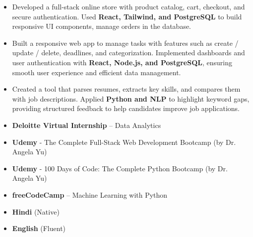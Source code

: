 

\begin{itemize}
\item Developed a full-stack online store with product catalog, cart, checkout, and secure authentication. Used \textbf{React, Tailwind, and PostgreSQL} to build responsive UI components, manage orders in the database. 
\end{itemize}
\smallskip
\smallskip
{}
\begin{itemize}
\item Built a responsive web app to manage tasks with features such as create / update / delete, deadlines, and categorization. Implemented dashboards and user authentication with \textbf{React, Node.js, and PostgreSQL}, ensuring smooth user experience and efficient data management. 
\end{itemize}
\smallskip
\smallskip
{}
\begin{itemize}
\item Created a tool that parses resumes, extracts key skills, and compares them with job descriptions. Applied \textbf{Python and NLP} to highlight keyword gaps, providing structured feedback to help candidates improve job applications. 
\end{itemize}
\smallskip
\smallskip

\smallskip
    \begin{itemize}
        \item \textbf{Deloitte Virtual Internship} – Data Analytics
\smallskip
        \item \textbf{Udemy} - The Complete Full-Stack Web Development Bootcamp (by Dr. Angela Yu)
\smallskip
\item \textbf{Udemy} - 100 Days of Code: The Complete Python Bootcamp (by Dr. Angela Yu)
\smallskip
        \item \textbf{freeCodeCamp} – Machine Learning with Python
    \end{itemize}
\smallskip
\smallskip

\begin{itemize}
\smallskip
    \item \textbf{Hindi }(Native)
\smallskip
    \item \textbf{English }(Fluent)
\smallskip
\end{itemize}

\cvproject{}